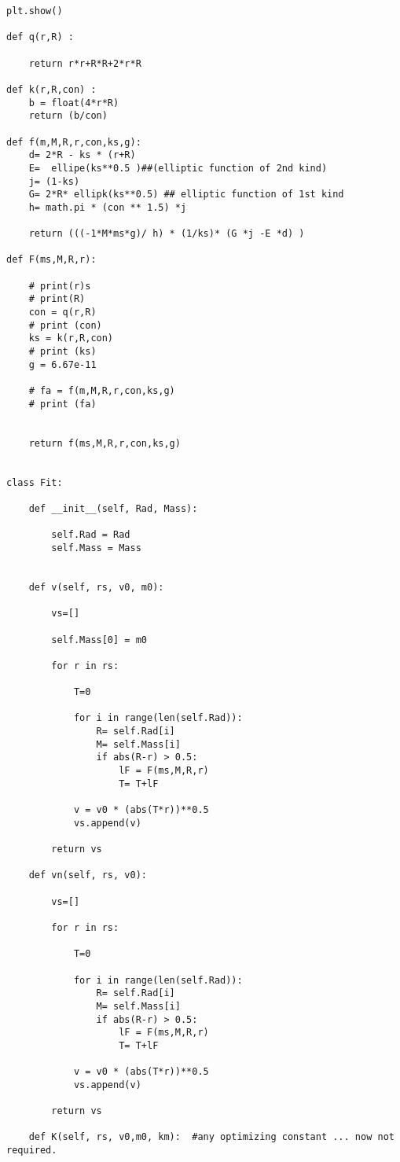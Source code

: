 \begin{Verbatim}[fontsize=\small,baselinestretch=0.9]
    plt.show()

def q(r,R) :

    return r*r+R*R+2*r*R

def k(r,R,con) :
    b = float(4*r*R)
    return (b/con)

def f(m,M,R,r,con,ks,g):
    d= 2*R - ks * (r+R)
    E=  ellipe(ks**0.5 )##(elliptic function of 2nd kind)
    j= (1-ks)
    G= 2*R* ellipk(ks**0.5) ## elliptic function of 1st kind
    h= math.pi * (con ** 1.5) *j

    return (((-1*M*ms*g)/ h) * (1/ks)* (G *j -E *d) )

def F(ms,M,R,r):

    # print(r)s
    # print(R)
    con = q(r,R)
    # print (con)
    ks = k(r,R,con)
    # print (ks)
    g = 6.67e-11

    # fa = f(m,M,R,r,con,ks,g)
    # print (fa)


    return f(ms,M,R,r,con,ks,g)


class Fit:

    def __init__(self, Rad, Mass):

        self.Rad = Rad
        self.Mass = Mass


    def v(self, rs, v0, m0):

        vs=[]

        self.Mass[0] = m0

        for r in rs:

            T=0

            for i in range(len(self.Rad)):
                R= self.Rad[i]
                M= self.Mass[i]
                if abs(R-r) > 0.5:
                    lF = F(ms,M,R,r)
                    T= T+lF

            v = v0 * (abs(T*r))**0.5
            vs.append(v)

        return vs

    def vn(self, rs, v0):

        vs=[]

        for r in rs:

            T=0

            for i in range(len(self.Rad)):
                R= self.Rad[i]
                M= self.Mass[i]
                if abs(R-r) > 0.5:
                    lF = F(ms,M,R,r)
                    T= T+lF

            v = v0 * (abs(T*r))**0.5
            vs.append(v)

        return vs

    def K(self, rs, v0,m0, km):  #any optimizing constant ... now not required.


\end{Verbatim}
